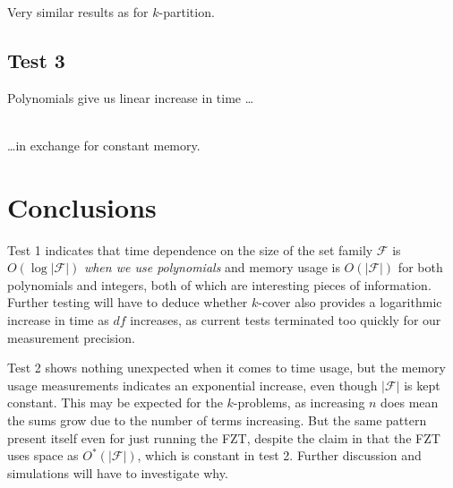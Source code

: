 \documentclass[a4paper, titlepage]{article}
\begin{document}
Very similar results as for $k$-partition.

\subsection*{Test 3}


Polynomials give us linear increase in time \ldots
\\\\

\ldots in exchange for constant memory.

\section{Conclusions}
Test 1 indicates that time dependence on the size of the set family $\mathcal{F}$ is $O(\log |\mathcal{F}|)$ \emph{when we use polynomials} and memory usage is $O(|\mathcal{F}|)$ for both polynomials and integers, both of which are interesting pieces of information. Further testing will have to deduce whether $k$-cover also provides a logarithmic increase in time as $df$ increases, as current tests terminated too quickly for our measurement precision.

Test 2 shows nothing unexpected when it comes to time usage, but the memory usage measurements indicates an exponential increase, even though $|\mathcal{F}|$ is kept constant. This may be expected for the $k$-problems, as increasing $n$ does mean the sums grow due to the number of terms increasing. But the same pattern present itself even for just running the FZT, despite the claim in \cite{cov_pack} that the FZT uses space as $O^*(|\mathcal{F}|)$, which is constant in test 2. Further discussion and simulations will have to investigate why.
\end{document}
